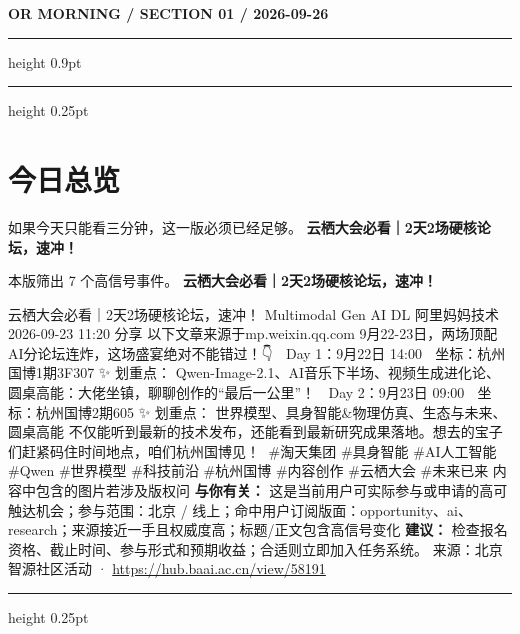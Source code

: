 \documentclass[10.5pt]{ctexart}
\begin{document}
{\small\bfseries OR MORNING / SECTION 01 / 2026-09-26}
\vspace{2mm}
\hrule height 0.9pt
\vspace{1.5mm}
\hrule height 0.25pt
\vspace{4mm}
\section*{今日总览}
{\color{ormuted} 如果今天只能看三分钟，这一版必须已经足够。}
\vspace{2mm}
{\fontsize{25}{29}\selectfont\bfseries 云栖大会必看｜2天2场硬核论坛，速冲！}\par
\vspace{2mm}
{\large 本版筛出 7 个高信号事件。}
\vspace{3mm}
{\Large\bfseries 云栖大会必看｜2天2场硬核论坛，速冲！}\par
云栖大会必看｜2天2场硬核论坛，速冲！ Multimodal Gen AI DL 阿里妈妈技术 2026-09-23 11:20 分享 以下文章来源于mp.weixin.qq.com 9月22-23日，两场顶配AI分论坛连炸，这场盛宴绝对不能错过！👇 🎨 Day 1：9月22日 14:00 📍 坐标：杭州国博1期3F307 ✨ 划重点： Qwen-Image-2.1、AI音乐下半场、视频生成进化论、圆桌高能：大佬坐镇，聊聊创作的“最后一公里”！ 🎨 Day 2：9月23日 09:00 📍 坐标：杭州国博2期605 ✨ 划重点： 世界模型、具身智能\&物理仿真、生态与未来、圆桌高能 不仅能听到最新的技术发布，还能看到最新研究成果落地。想去的宝子们赶紧码住时间地点，咱们杭州国博见！👋 \#淘天集团 \#具身智能 \#AI人工智能 \#Qwen \#世界模型 \#科技前沿 \#杭州国博 \#内容创作 \#云栖大会 \#未来已来 内容中包含的图片若涉及版权问
\textbf{与你有关：} 这是当前用户可实际参与或申请的高可触达机会；参与范围：北京 / 线上；命中用户订阅版面：opportunity、ai、research；来源接近一手且权威度高；标题/正文包含高信号变化
\textbf{建议：} 检查报名资格、截止时间、参与形式和预期收益；合适则立即加入任务系统。
{\footnotesize\color{ormuted} 来源：北京智源社区活动 · \url{https://hub.baai.ac.cn/view/58191}}
\vspace{3mm}
\hrule height 0.25pt
\vspace{3mm}
\end{document}
